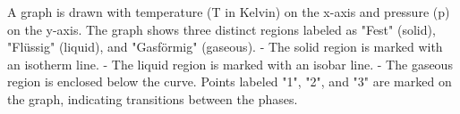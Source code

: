 A graph is drawn with temperature (T in Kelvin) on the x-axis and pressure (p) on the y-axis. The graph shows three distinct regions labeled as "Fest" (solid), "Flüssig" (liquid), and "Gasförmig" (gaseous).  
- The solid region is marked with an isotherm line.  
- The liquid region is marked with an isobar line.  
- The gaseous region is enclosed below the curve.  
Points labeled "1", "2", and "3" are marked on the graph, indicating transitions between the phases.